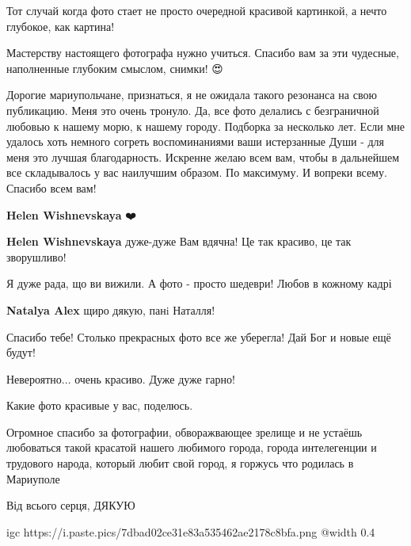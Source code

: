 
Тот случай когда фото стает не просто очередной красивой картинкой, а нечто
глубокое, как картина!

Мастерству настоящего фотографа нужно учиться. Спасибо вам за эти чудесные,
наполненные глубоким смыслом, снимки! 😍🙏


Дорогие мариупольчане, признаться, я не ожидала такого резонанса на свою
публикацию. Меня это очень тронуло. Да, все фото делались с безграничной
любовью к нашему морю, к нашему городу. Подборка за несколько лет. Если мне
удалось хоть немного согреть воспоминаниями ваши истерзанные Души - для меня
это лучшая благодарность. Искренне желаю всем вам, чтобы в дальнейшем все
складывалось у вас наилучшим образом. По максимуму. И вопреки всему. Спасибо
всем вам!

\begin{itemize} %
\textbf{Helen Wishnevskaya} ❤️

\textbf{Helen Wishnevskaya} дуже-дуже Вам вдячна! Це так красиво, це так зворушливо!🤗😍
\end{itemize} %


Я дуже рада, що ви вижили.
А фото - просто шедеври!
Любов в кожному кадрі

\textbf{Natalya Alex} щиро дякую, панi Наталля!


Спасибо тебе! Столько прекрасных фото все же уберегла! Дай Бог и новые ещё будут!


Невероятно... очень красиво. Дуже дуже гарно!


Какие фото красивые у вас, поделюсь.


Огромное спасибо за фотографии, обворажвающее зрелище и не устаёшь любоваться
такой красатой нашего любимого города, города интелегенции и трудового народа,
который любит свой город, я горжусь что родилась в Мариуполе


Від всього серця, ДЯКУЮ


\ifcmt
  igc https://i.paste.pics/7dbad02ce31e83a535462ae2178c8bfa.png
  @width 0.4
\fi
